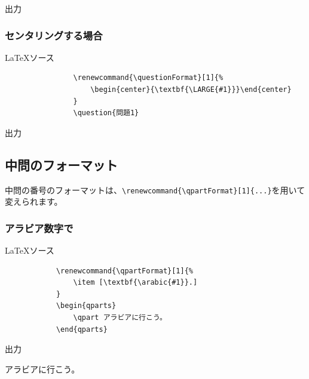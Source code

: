 \documentclass[dvipdfmx,a4j,11pt]{jarticle}
\newenvironment{inputbox}{%
	\begin{itembox}[r]{\LaTeX ソース}
}{
	\end{itembox}
}
\newenvironment{outputbox}{%
	\begin{itembox}[r]{出力}
}{%
	\end{itembox}
}
\begin{document}
		\begin{outputbox}
		\end{outputbox}
			
	\subsubsection{センタリングする場合}
		\begin{inputbox}
			\begin{verbatim}
				\renewcommand{\questionFormat}[1]{%
				    \begin{center}{\textbf{\LARGE{#1}}}\end{center}
				}
				\question{問題1}
			\end{verbatim}
		\end{inputbox}

		\renewcommand{\questionFormat}[1]{%
			\begin{center}{\textbf{\LARGE{#1}}}\end{center}
		}
		\begin{outputbox}
		\end{outputbox}
			

\subsection{中問のフォーマット}
	中問の番号のフォーマットは、{\tt \verb"\renewcommand{\qpartFormat}[1]{...}"}を用いて変えられます。
	
\subsubsection{アラビア数字で}
	\begin{inputbox}
		\begin{verbatim}
			\renewcommand{\qpartFormat}[1]{%
			    \item [\textbf{\arabic{#1}}.]
			}
			\begin{qparts}
			    \qpart アラビアに行こう。
			\end{qparts}
		\end{verbatim}

	\end{inputbox}
	
	\begin{outputbox}
		\renewcommand{\qpartFormat}[1]{%
			\item [\textbf{\arabic{#1}}.]
		}
		\begin{qparts}
			\qpart アラビアに行こう。
		\end{qparts}
	\end{outputbox}
	
\end{document}
